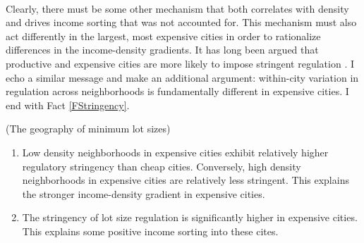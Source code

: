 \documentclass[]{article}
\begin{document}
\paragraph*{} 
Clearly, there must be some other mechanism that both correlates with density and drives income sorting that was not accounted for. This mechanism must also act differently in the largest, most expensive cities in order to rationalize differences in the income-density gradients. It has long been argued that productive and expensive cities are more likely to impose stringent regulation \citep{HILBER2013,parkho, durantonpugaurbgrowth}. I echo a similar message and make an additional argument: within-city variation in regulation across neighborhoods is fundamentally different in expensive cities. I end with Fact \ref{FStringency}. 

\begin{Fact}\label{FStringency}
	(The geography of minimum lot sizes)
	\begin{enumerate}
		\item  Low density neighborhoods in expensive cities exhibit relatively higher regulatory stringency than cheap cities. Conversely, high density neighborhoods in expensive cities are relatively less stringent. This explains the stronger income-density gradient in expensive cities. 		
		\item  The stringency of lot size regulation is significantly higher in expensive cities. This explains some positive income sorting into these cites. 
	\end{enumerate}
\end{Fact}
	
\end{document}
